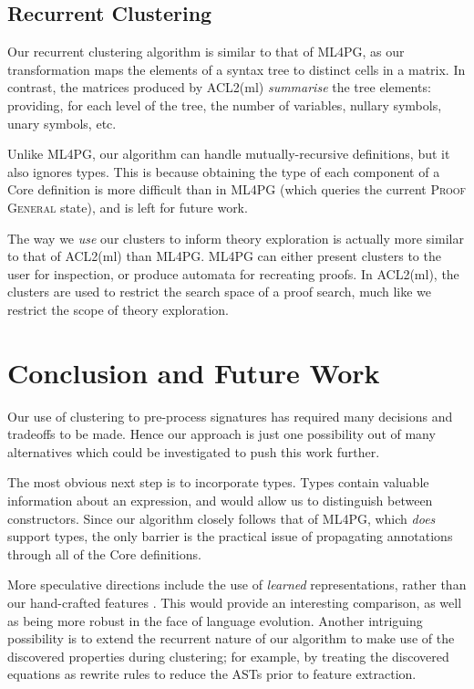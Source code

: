 \subsection{Recurrent Clustering}
\label{sec:clusteringexpressions}

Our recurrent clustering algorithm is similar to that of ML4PG, as our
transformation maps the elements of a syntax tree to distinct cells in a
matrix. In contrast, the matrices produced by ACL2(ml) \emph{summarise} the tree
elements: providing, for each level of the tree, the number of variables,
nullary symbols, unary symbols, etc.

Unlike ML4PG, our algorithm can handle mutually-recursive definitions, but it
also ignores types. This is because obtaining the type of each component of a
Core definition is more difficult than in ML4PG (which queries the current
\textsc{Proof General} state), and is left for future work.

The way we \emph{use} our clusters to inform theory exploration is actually more
similar to that of ACL2(ml) than ML4PG. ML4PG can either present clusters to the
user for inspection, or produce automata for recreating proofs. In ACL2(ml), the
clusters are used to restrict the search space of a proof search, much like we
restrict the scope of theory exploration.

\section{Conclusion and Future Work}
\label{sec:conclusion}

Our use of clustering to pre-process \qspec{} signatures has required many
decisions and tradeoffs to be made. Hence our approach is just one possibility
out of many alternatives which could be investigated to push this work further.

The most obvious next step is to incorporate types. Types contain valuable
information about an expression, and would allow us to distinguish between
constructors. Since our algorithm closely follows that of ML4PG, which
\emph{does} support types, the only barrier is the practical issue of
propagating annotations through all of the Core definitions.

More speculative directions include the use of \emph{learned} representations,
rather than our hand-crafted features \cite{bengio2013representation}. This
would provide an interesting comparison, as well as being more robust in the
face of language evolution. Another intriguing possibility is to extend the
recurrent nature of our algorithm to make use of the discovered properties
during clustering; for example, by treating the discovered equations as rewrite
rules to reduce the ASTs prior to feature extraction.

